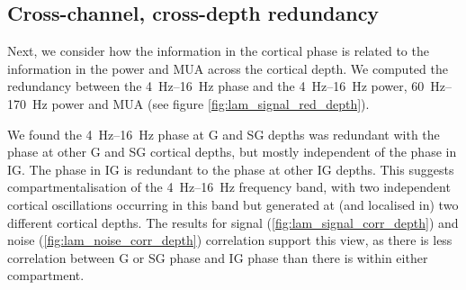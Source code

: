 

\subsection{Cross-channel, cross-depth redundancy}

Next, we consider how the information in the cortical phase is related to the information in the power and \ac{MUA} across the cortical depth.
We computed the redundancy between the \SIrange{4}{16}{Hz} phase and the \SIrange{4}{16}{Hz} power, \SIrange{60}{170}{Hz} power and \ac{MUA} (see figure \autoref{fig:lam_signal_red_depth}).

We found the \SIrange{4}{16}{Hz} phase at \ac{G} and \ac{SG} depths was redundant with the phase at other \ac{G} and \ac{SG} cortical depths, but mostly independent of the phase in \ac{IG}.
The phase in \ac{IG} is redundant to the phase at other \ac{IG} depths.
This suggests compartmentalisation of the \SIrange{4}{16}{Hz} frequency band, with two independent cortical oscillations occurring in this band but generated at (and localised in) two different cortical depths.
The results for signal (\autoref{fig:lam_signal_corr_depth}) and noise (\autoref{fig:lam_noise_corr_depth}) correlation support this view, as there is less correlation between \ac{G} or \ac{SG} phase and \ac{IG} phase than there is within either compartment.



